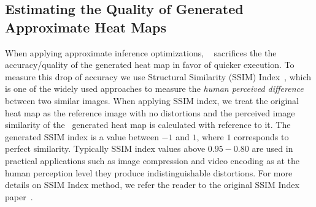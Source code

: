 \subsection{Estimating the Quality of Generated Approximate Heat Maps}

When applying approximate inference optimizations, \system~ sacrifices the the accuracy/quality of the generated heat map in favor of quicker execution.
To measure this drop of accuracy we use Structural Similarity (SSIM) Index~\cite{wang2004image}, which is one of the widely used approaches to measure the \textit{human perceived difference} between two similar images.
When applying SSIM index, we treat the original heat map as the reference image with no distortions and the perceived image similarity of the \system~generated heat map is calculated with reference to it.
The generated SSIM index is a value between $-1$ and $1$, where $1$ corresponds to perfect similarity.
Typically SSIM index values above $0.95-0.80$ are used in practical applications such as image compression and video encoding as at the human perception level they produce indistinguishable distortions.
For more details on SSIM Index method, we refer the reader to the original SSIM Index paper~\cite{wang2004image}.